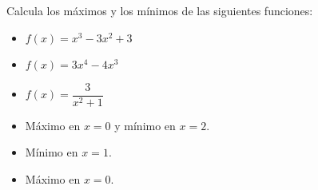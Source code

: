 \begin{ex}
	Calcula los máximos y los mínimos de las siguientes funciones:\\
	\begin{itemize}
		\item $f(x)=x^3-3x^2+3$
		\item $f(x)=3x^4-4x^3$
		\item $f(x)=\dfrac{3}{x^2+1}$
	\end{itemize}
	\begin{sol}
		\begin{itemize}
			\item Máximo en $x=0$ y mínimo en $x=2$.
			\item Mínimo en $x=1$.
			\item Máximo en $x=0$.
		\end{itemize}
	\end{sol}
\end{ex}
